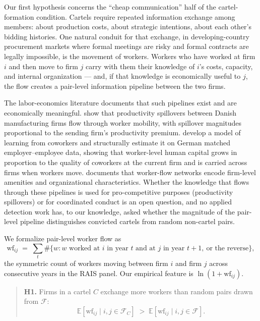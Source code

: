 Our first hypothesis concerns the ``cheap communication'' half of the cartel-formation condition. Cartels require repeated information exchange among members: about production costs, about strategic intentions, about each other's bidding histories. One natural conduit for that exchange, in developing-country procurement markets where formal meetings are risky and formal contracts are legally impossible, is the movement of workers. Workers who have worked at firm $i$ and then move to firm $j$ carry with them their knowledge of $i$'s costs, capacity, and internal organization --- and, if that knowledge is economically useful to $j$, the flow creates a pair-level information pipeline between the two firms.

The labor-economics literature documents that such pipelines exist and are economically meaningful. \citet{stoyanov2012worker} show that productivity spillovers between Danish manufacturing firms flow through worker mobility, with spillover magnitudes proportional to the sending firm's productivity premium. \citet{jarosch2021learning} develop a model of learning from coworkers and structurally estimate it on German matched employer--employee data, showing that worker-level human capital grows in proportion to the quality of coworkers at the current firm and is carried across firms when workers move. \citet{sorkin2018ranking} documents that worker-flow networks encode firm-level amenities and organizational characteristics. Whether the knowledge that flows through these pipelines is used for pro-competitive purposes (productivity spillovers) or for coordinated conduct is an open question, and no applied detection work has, to our knowledge, asked whether the magnitude of the pair-level pipeline distinguishes convicted cartels from random non-cartel pairs.

We formalize pair-level worker flow as
\[
\mathrm{wf}_{ij} \;=\; \sum_{t} \#\bigl\{w : w \text{ worked at } i \text{ in year } t \text{ and at } j \text{ in year } t+1,\ \text{or the reverse}\bigr\},
\]
the symmetric count of workers moving between firm $i$ and firm $j$ across consecutive years in the RAIS panel. Our empirical feature is $\ln(1 + \mathrm{wf}_{ij})$.

\begin{quotation}
\noindent\textbf{H1.} Firms in a cartel $C$ exchange more workers than random pairs drawn from $\mathcal{F}$:
\[
\mathbb{E}\!\left[\mathrm{wf}_{ij} \mid i, j \in \mathcal{F}_C \right]
\;>\;
\mathbb{E}\!\left[\mathrm{wf}_{ij} \mid i, j \in \mathcal{F} \right].
\]
\end{quotation}

